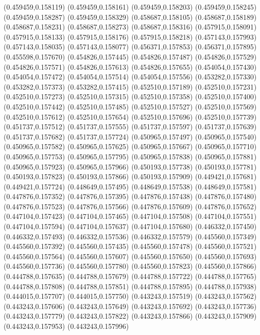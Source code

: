 (0.459459,0.158119)
(0.459459,0.158161)
(0.459459,0.158203)
(0.459459,0.158245)
(0.459459,0.158287)
(0.459459,0.158329)
(0.458687,0.158105)
(0.458687,0.158189)
(0.458687,0.158231)
(0.458687,0.158273)
(0.458687,0.158316)
(0.457915,0.158091)
(0.457915,0.158133)
(0.457915,0.158176)
(0.457915,0.158218)
(0.457143,0.157993)
(0.457143,0.158035)
(0.457143,0.158077)
(0.456371,0.157853)
(0.456371,0.157895)
(0.455598,0.157670)
(0.454826,0.157445)
(0.454826,0.157487)
(0.454826,0.157529)
(0.454826,0.157571)
(0.454826,0.157613)
(0.454826,0.157655)
(0.454054,0.157430)
(0.454054,0.157472)
(0.454054,0.157514)
(0.454054,0.157556)
(0.453282,0.157330)
(0.453282,0.157373)
(0.453282,0.157415)
(0.452510,0.157189)
(0.452510,0.157231)
(0.452510,0.157273)
(0.452510,0.157315)
(0.452510,0.157358)
(0.452510,0.157400)
(0.452510,0.157442)
(0.452510,0.157485)
(0.452510,0.157527)
(0.452510,0.157569)
(0.452510,0.157612)
(0.452510,0.157654)
(0.452510,0.157696)
(0.452510,0.157739)
(0.451737,0.157512)
(0.451737,0.157555)
(0.451737,0.157597)
(0.451737,0.157639)
(0.451737,0.157682)
(0.451737,0.157724)
(0.450965,0.157497)
(0.450965,0.157540)
(0.450965,0.157582)
(0.450965,0.157625)
(0.450965,0.157667)
(0.450965,0.157710)
(0.450965,0.157753)
(0.450965,0.157795)
(0.450965,0.157838)
(0.450965,0.157881)
(0.450965,0.157923)
(0.450965,0.157966)
(0.450193,0.157738)
(0.450193,0.157781)
(0.450193,0.157823)
(0.450193,0.157866)
(0.450193,0.157909)
(0.449421,0.157681)
(0.449421,0.157724)
(0.448649,0.157495)
(0.448649,0.157538)
(0.448649,0.157581)
(0.447876,0.157352)
(0.447876,0.157395)
(0.447876,0.157438)
(0.447876,0.157480)
(0.447876,0.157523)
(0.447876,0.157566)
(0.447876,0.157609)
(0.447876,0.157652)
(0.447104,0.157423)
(0.447104,0.157465)
(0.447104,0.157508)
(0.447104,0.157551)
(0.447104,0.157594)
(0.447104,0.157637)
(0.447104,0.157680)
(0.446332,0.157450)
(0.446332,0.157493)
(0.446332,0.157536)
(0.446332,0.157579)
(0.445560,0.157349)
(0.445560,0.157392)
(0.445560,0.157435)
(0.445560,0.157478)
(0.445560,0.157521)
(0.445560,0.157564)
(0.445560,0.157607)
(0.445560,0.157650)
(0.445560,0.157693)
(0.445560,0.157736)
(0.445560,0.157780)
(0.445560,0.157823)
(0.445560,0.157866)
(0.444788,0.157635)
(0.444788,0.157679)
(0.444788,0.157722)
(0.444788,0.157765)
(0.444788,0.157808)
(0.444788,0.157851)
(0.444788,0.157895)
(0.444788,0.157938)
(0.444015,0.157707)
(0.444015,0.157750)
(0.443243,0.157519)
(0.443243,0.157562)
(0.443243,0.157606)
(0.443243,0.157649)
(0.443243,0.157692)
(0.443243,0.157736)
(0.443243,0.157779)
(0.443243,0.157822)
(0.443243,0.157866)
(0.443243,0.157909)
(0.443243,0.157953)
(0.443243,0.157996)
